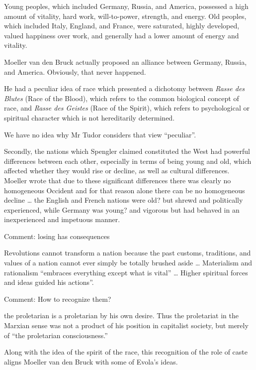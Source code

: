 \begin{quotex}
Young peoples, which included Germany, Russia, and America, possessed a high amount of vitality, hard work,
will-to-power, strength, and energy. Old peoples, which included Italy, England, and France, were saturated, highly
developed, valued happiness over work, and generally had a lower amount of energy and vitality. 

\end{quotex}
Moeller van den Bruck actually proposed an alliance between Germany, Russia, and America. Obviously, that never
happened.

\begin{quotex}
He had a peculiar idea of race which presented a dichotomy between \emph{Rasse des Blutes} (Race of the Blood), which
refers to the common biological concept of race, and \emph{Rasse des Geistes} (Race of the Spirit), which refers to
psychological or spiritual character which is not hereditarily determined. 

\end{quotex}
We have no idea why Mr Tudor considers that view “peculiar”.

\begin{quotex}
Secondly, the nations which Spengler claimed constituted the West had powerful differences between each other,
especially in terms of being young and old, which affected whether they would rise or decline, as well as cultural
differences. Moeller wrote that due to these significant differences there was clearly no homogeneous Occident and for
that reason alone there can be no homogeneous decline … the English and French nations were old? but shrewd and
politically experienced, while Germany was young? and vigorous but had behaved in an inexperienced and impetuous
manner. 

\end{quotex}
Comment: losing has consequences

\begin{quotex}
Revolutions cannot transform a nation because the past customs, traditions, and values of a nation cannot ever simply be
totally brushed aside … Materialism and rationalism “embraces everything except what is vital” … Higher spiritual
forces and ideas guided his actions”. 

\end{quotex}
Comment: How to recognize them?

\begin{quotex}
the proletarian is a proletarian by his own desire. Thus the proletariat in the Marxian sense was not a product of his
position in capitalist society, but merely of “the proletarian consciousness.” 

\end{quotex}
Along with the idea of the spirit of the race, this recognition of the role of caste aligns Moeller van den Bruck with
some of Evola's ideas.

